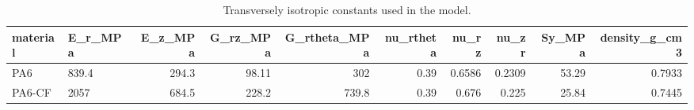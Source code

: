 \begin{table}[htbp]
\centering
\caption{Transversely isotropic constants used in the model.}
\label{tab:T10_01_material_constants}
\begin{tabular}{llrrrrrrrr}
\toprule
material & E\_r\_MPa & E\_z\_MPa & G\_rz\_MPa & G\_rtheta\_MPa & nu\_rtheta & nu\_rz & nu\_zr & Sy\_MPa & density\_g\_cm3 \\
\midrule
PA6 & 839.4 & 294.3 & 98.11 & 302 & 0.39 & 0.6586 & 0.2309 & 53.29 & 0.7933 \\
PA6-CF & 2057 & 684.5 & 228.2 & 739.8 & 0.39 & 0.676 & 0.225 & 25.84 & 0.7445 \\
\bottomrule
\end{tabular}
\end{table}
